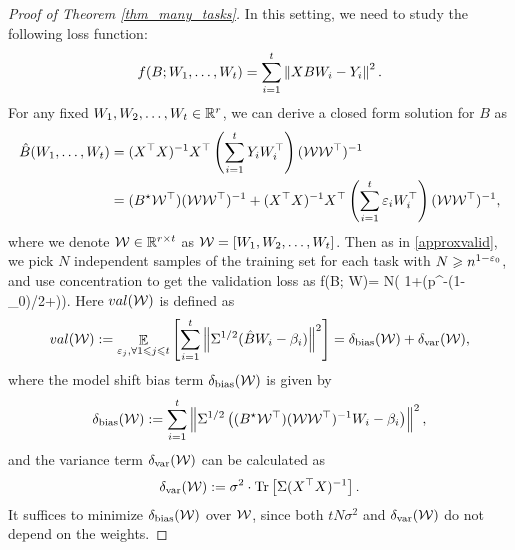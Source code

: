 \begin{proof}[Proof of Theorem \ref{thm_many_tasks}]
In this setting, we need to study the following loss function:
\begin{align}
	f(B; W_1, \dots, W_t) = \sum_{i=1}^t \bignorm{X B W_i - Y_i}^2. \label{eq_mtl_same_cov}
\end{align}
For any fixed $W_1, W_2, \dots, W_t \in \R^r$, we can derive a closed form solution for $B$ as
	\begin{align*}
		\hat{B}(W_1, \dots, W_t) &= (X^{\top}X)^{-1} X^{\top} \bigbrace{\sum_{i=1}^t Y_i W_i^{\top}} (\cal W  \cal W^{\top})^{-1} \\
		&= (B^\star \cal W ^{\top}) (\cal W \cal W ^{\top})^{-1} + (X^{\top}X)^{-1}X^{\top} \bigbrace{\sum_{i=1}^t \varepsilon_i W_i^{\top}} (\cal W \cal W^{\top})^{-1},
	\end{align*}
	where we denote $\cal W \in\real^{r\times t}$ as $\cal W=[W_1, W_2, \dots, W_t]$.
Then as in \eqref{approxvalid}, we pick $N$ independent samples of the training set for each task with $N\ge n^{1-\e_0}$, and use concentration to get the validation loss as
\be\label{eq_multival}\wt f(\hat B; \cal W)=  N\cdot \left( 1+\OO(p^{-(1-\e_0)/2+\e})\right).\ee
Here $\val(\cal W)$ is defined as
	$$\val( \cal W):=\exarg{\varepsilon_j, \forall 1\le j\le t}{ \sum_{i=1}^t \bignorm{\Sigma^{1/2}( \hat B W_i - \beta_i)}^2} =  \delta_{\bias}(\cal W) + \delta_{\vari}(\cal W),$$
where the model shift bias term $\delta_{\bias}(\cal W) $ is given by
	\begin{align*}
		\delta_{\bias}(\cal W) :=\sum_{i=1}^t  \bignorm{\Sigma^{1/2}\bigbrace{(B^\star \cal W^\top) (\cal W\cal W^{\top})^{-1} W_i - \beta_i}}^2,
	\end{align*}
	and the variance term $\delta_{\vari}(\cal W)$ can be calculated as
	\begin{align*}
		\delta_{\vari}(\cal W):= \sigma^2 \cdot \bigtr{\Sigma (X^{\top}X)^{-1}}.
	\end{align*}
It suffices to minimize $\delta_{\bias}(\cal W)$ over $\cal W$, since both $t N \sigma^2$ and $\delta_{\vari}(\cal W)$ do not depend on the weights.


\end{proof}
